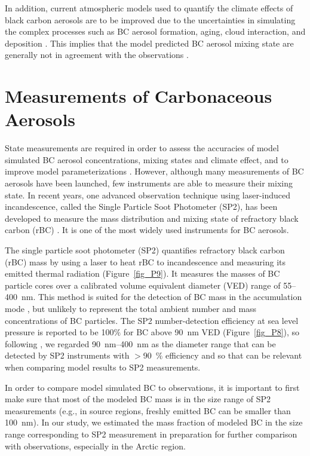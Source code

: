\documentclass[12pt, fullpage]{uiucthesis2009_2}
\begin{document}
	In addition, current atmospheric models used to quantify the climate effects of black carbon aerosols are to be improved due to the uncertainties in simulating the complex processes such as BC aerosol formation, aging, cloud interaction, and deposition \citep{Kipling2016}. This implies that the model predicted BC aerosol mixing state are generally not in agreement with the observations \citep{Raatikainen2015}. 
	
	\section{Measurements of Carbonaceous Aerosols}
	State measurements are required in order to assess the accuracies of model simulated BC aerosol concentrations, mixing states and climate effect, and to improve model parameterizations \citep[e.g.][]{Reddington2013}. However, although many measurements of BC aerosols have been launched, few instruments are able to measure their mixing state. In recent years, one advanced observation technique using laser-induced incandescence, called the Single Particle Soot Photometer (SP2), has been developed to measure the mass distribution and mixing state of refractory black carbon (rBC) \citep[][]{baumgardner2004warming,schulz2006radiative}. It is one of the most widely used instruments for BC aerosols. 
	
	The single particle soot photometer (SP2) quantifies refractory black carbon (rBC) mass by using a laser to heat rBC to incandescence and measuring its emitted thermal radiation (Figure~\ref{fig_P9}). It measures the masses of BC particle cores over a calibrated volume equivalent diameter (VED) range of 55--400~nm. This method is suited for the detection of BC mass in the accumulation mode \citep{schwarz2010global}, but unlikely to represent the total ambient number and mass concentrations of BC particles. The SP2 number-detection efficiency at sea level pressure is reported to be 100$\%$ for BC above 90~nm VED \citep{schwarz2010global} (Figure~\ref{fig_P8}), so following \citet{Reddington2013}, we regarded 90~nm--400~nm as the diameter range that can be detected by SP2 instruments with $>$90~$\%$ efficiency and so that can be relevant when comparing model results to SP2 measurements.
	
	In order to compare model simulated BC to observations, it is important to first make sure that most of the modeled BC mass is in the size range of SP2 measurements (e.g., in source regions, freshly emitted BC can be smaller than 100~nm). In our study, we estimated the mass fraction of modeled BC in the size range corresponding to SP2 measurement in preparation for further comparison with observations, especially in the Arctic region.
	
\end{document}
